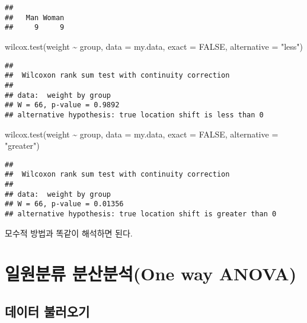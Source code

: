 \documentclass[
]{article}
\newenvironment{Shaded}{\begin{snugshade}}{\end{snugshade}}
\newcommand{\AttributeTok}[1]{\textcolor[rgb]{0.77,0.63,0.00}{#1}}
\newcommand{\ConstantTok}[1]{\textcolor[rgb]{0.00,0.00,0.00}{#1}}
\newcommand{\FunctionTok}[1]{\textcolor[rgb]{0.00,0.00,0.00}{#1}}
\newcommand{\NormalTok}[1]{#1}
\newcommand{\SpecialCharTok}[1]{\textcolor[rgb]{0.00,0.00,0.00}{#1}}
\newcommand{\StringTok}[1]{\textcolor[rgb]{0.31,0.60,0.02}{#1}}
\begin{document}
\begin{verbatim}
## 
##   Man Woman 
##     9     9
\end{verbatim}

\begin{Shaded}
\begin{Highlighting}[]
\FunctionTok{wilcox.test}\NormalTok{(weight }\SpecialCharTok{\textasciitilde{}}\NormalTok{ group, }\AttributeTok{data =}\NormalTok{ my.data, }\AttributeTok{exact =} \ConstantTok{FALSE}\NormalTok{, }\AttributeTok{alternative =} \StringTok{"less"}\NormalTok{)}
\end{Highlighting}
\end{Shaded}

\begin{verbatim}
## 
##  Wilcoxon rank sum test with continuity correction
## 
## data:  weight by group
## W = 66, p-value = 0.9892
## alternative hypothesis: true location shift is less than 0
\end{verbatim}

\begin{Shaded}
\begin{Highlighting}[]
\FunctionTok{wilcox.test}\NormalTok{(weight }\SpecialCharTok{\textasciitilde{}}\NormalTok{ group, }\AttributeTok{data =}\NormalTok{ my.data, }\AttributeTok{exact =} \ConstantTok{FALSE}\NormalTok{, }\AttributeTok{alternative =} \StringTok{"greater"}\NormalTok{)}
\end{Highlighting}
\end{Shaded}

\begin{verbatim}
## 
##  Wilcoxon rank sum test with continuity correction
## 
## data:  weight by group
## W = 66, p-value = 0.01356
## alternative hypothesis: true location shift is greater than 0
\end{verbatim}

모수적 방법과 똑같이 해석하면 된다.

\hypertarget{uxc77cuxc6d0uxbd84uxb958-uxbd84uxc0b0uxbd84uxc11done-way-anova}{%
\section{일원분류 분산분석(One way ANOVA)}\label{uxc77cuxc6d0uxbd84uxb958-uxbd84uxc0b0uxbd84uxc11done-way-anova}}

\hypertarget{uxb370uxc774uxd130-uxbd88uxb7ecuxc624uxae30-3}{%
\subsection{데이터 불러오기}\label{uxb370uxc774uxd130-uxbd88uxb7ecuxc624uxae30-3}}
\end{document}
